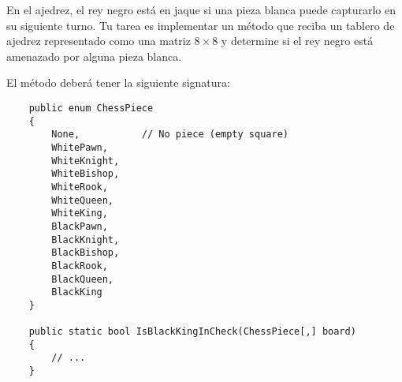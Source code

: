 En el ajedrez, el rey negro está en jaque si una pieza blanca puede capturarlo en su siguiente turno.  
Tu tarea es implementar un método que reciba un tablero de ajedrez representado como una matriz \(8 \times 8\) y determine si el rey negro está amenazado por alguna pieza blanca.

El método deberá tener la siguiente signatura:

\begin{lstlisting}
    public enum ChessPiece
    {
        None,           // No piece (empty square)
        WhitePawn,
        WhiteKnight,
        WhiteBishop,
        WhiteRook,
        WhiteQueen,
        WhiteKing,
        BlackPawn,
        BlackKnight,
        BlackBishop,
        BlackRook,
        BlackQueen,
        BlackKing
    }
    
    public static bool IsBlackKingInCheck(ChessPiece[,] board)
    {
        // ...
    }
\end{lstlisting}




